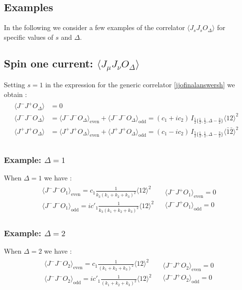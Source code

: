 \documentclass[a4paper,11pt]{article}
\begin{document}
\subsection*{Examples}
In the following we consider a few examples of the correlator $\langle J_sJ_sO_{\Delta}\rangle$ for specific values of $s$ and $\Delta.$
\subsection*{Spin one current: $\langle J_\mu J_\nu O_\Delta\rangle$}
Setting $s=1$ in the expression for the generic correlator \eqref{jjofinalanswersh} we obtain :
\begin{align}
\label{jjosphappendix}
\begin{split}
\langle J^- J^+ O_{\Delta} \rangle &= 0\\
\langle J^-J^- O_{\Delta} \rangle&=\langle J^-J^- O_{\Delta} \rangle_{\text{even}}+\langle J^-J^- O_{\Delta} \rangle_{\text{odd}}=\left(c_1+ i c_2\right)\,I_{\frac{5}{2}\{\frac{1}{2},\frac{1}{2},\Delta-\frac{3}{2}\}} \langle 12 \rangle^2\\[5 pt]
\langle J^+J^+ O_{\Delta} \rangle&=\langle J^+J^+ O_{\Delta} \rangle_{\text{even}}+\langle J^+J^+ O_{\Delta} \rangle_{\text{odd}}=\left(c_1 - i c_2\right)\,I_{\frac{5}{2}\{\frac{1}{2},\frac{1}{2},\Delta-\frac{3}{2}\}} \langle \bar 1\bar 2 \rangle^2\\[5 pt]
\end{split}
\end{align}
\subsubsection*{Example: $\Delta=1$}
When $\Delta=1$ we have :
\begin{align}
\begin{split}
&\langle J^-J^-O_1 \rangle_{\text{even}} = c_1 \frac{1}{k_3(k_1+k_2+k_3)^2}\langle 12 \rangle^2\\[5 pt]
&\langle J^-J^-O_1 \rangle_{\text{odd}} = ic'_1 \frac{1}{k_3(k_1+k_2+k_3)^2}\langle 12 \rangle^2
\end{split}
\begin{split}
&\langle J^-J^+O_1 \rangle_{\text{even}} =0\\[5 pt]
&\langle J^-J^+O_1 \rangle_{\text{odd}} =0
\end{split}
\end{align}
\subsubsection*{Example: $\Delta=2$}
When $\Delta=2$ we have :
\begin{align}
\begin{split}
&\langle J^-J^-O_2 \rangle_{\text{even}} = c_1 \frac{1}{(k_1+k_2+k_3)^2}\langle 12 \rangle^2\\[5 pt]
&\langle J^-J^-O_2 \rangle_{\text{odd}} = ic'_1 \frac{1}{(k_1+k_2+k_3)^2}\langle 12 \rangle^2
\end{split}
\begin{split}
&\langle J^-J^+O_2 \rangle_{\text{even}} =0\\[5 pt]
&\langle J^-J^+O_2 \rangle_{\text{odd}} =0
\end{split}
\end{align}
\end{document}

